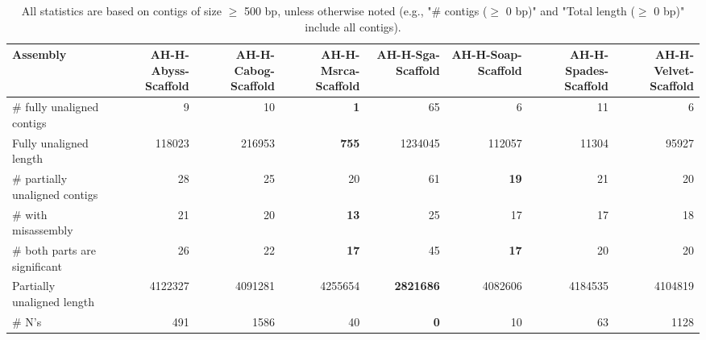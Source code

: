 \documentclass[12pt,a4paper]{article}
\begin{document}
\begin{table}[ht]
\begin{center}
\caption{All statistics are based on contigs of size $\geq$ 500 bp, unless otherwise noted (e.g., "\# contigs ($\geq$ 0 bp)" and "Total length ($\geq$ 0 bp)" include all contigs).}
\begin{tabular}{|l*{7}{|r}|}
\hline
Assembly & AH-H-Abyss-Scaffold & AH-H-Cabog-Scaffold & AH-H-Msrca-Scaffold & AH-H-Sga-Scaffold & AH-H-Soap-Scaffold & AH-H-Spades-Scaffold & AH-H-Velvet-Scaffold \\ \hline
\# fully unaligned contigs & 9 & 10 & {\bf 1} & 65 & 6 & 11 & 6 \\ \hline
Fully unaligned length & 118023 & 216953 & {\bf 755} & 1234045 & 112057 & 11304 & 95927 \\ \hline
\# partially unaligned contigs & 28 & 25 & 20 & 61 & {\bf 19} & 21 & 20 \\ \hline
\hspace{5mm}\# with misassembly & 21 & 20 & {\bf 13} & 25 & 17 & 17 & 18 \\ \hline
\hspace{5mm}\# both parts are significant & 26 & 22 & {\bf 17} & 45 & {\bf 17} & 20 & 20 \\ \hline
Partially unaligned length & 4122327 & 4091281 & 4255654 & {\bf 2821686} & 4082606 & 4184535 & 4104819 \\ \hline
\# N's & 491 & 1586 & 40 & {\bf 0} & 10 & 63 & 1128 \\ \hline
\end{tabular}
\end{center}
\end{table}
\end{document}
